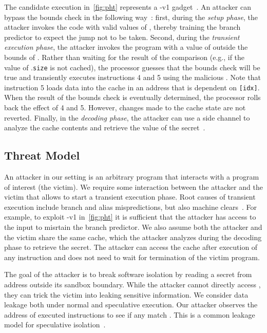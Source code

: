 \documentclass[conference]{IEEEtran}
\begin{document}
The candidate execution in~\autoref{fig:pht} represents a \spectre-v1 gadget~\cite{KocherHFGGHHLM019}.
An attacker can bypass the bounds check in the following way~\cite{CanellaB0LBOPEG19}:
first, during the \emph{setup phase}, the attacker invokes the code with valid values of \varidx, thereby training the branch predictor to expect the jump not to be taken.
Second, during the \emph{transient execution phase}, the attacker invokes the program with a value of \varidx outside the bounds of \varA.
Rather than waiting for the result of the comparison (e.g., if the value of \varA.\texttt{size} is not cached), the processor guesses that the bounds check will be true and transiently executes instructions 4 and 5 using the malicious \varidx.
Note that instruction 5 loads data into the cache in an address that is dependent on \texttt{{\varA}[{\color{violet}idx}]}.
When the result of the bounds check is eventually determined, the processor rolls back the effect of 4 and 5. %
However, changes made to the cache state are not reverted.
Finally, in the \emph{decoding phase}, the attacker can use a side channel to analyze the cache contents and retrieve the value of the secret~\cite{LiuYGHL15}.

\subsection{Threat Model}
\label{sec:threatmodel}

An attacker in our setting is an arbitrary program that interacts with a program of interest (the victim).
We require some interaction between the attacker and the victim that allows to start a transient execution phase.
Root causes of transient execution include branch and alias mispredictions, but also machine clears~\cite{ragab_rage_2021}.
For example, to exploit \spectre-v1 in~\autoref{fig:pht} it is sufficient that the attacker has access to the input \varidx to {mis{rt}ain} the branch predictor.
We also assume both the attacker and the victim share the same cache, which the attacker analyzes during the decoding phase to retrieve the secret.
The attacker can access the cache after execution of any instruction and does not need to wait for termination of the victim program.

The goal of the attacker is to break software isolation by reading a secret from address \secret{} outside its sandbox boundary.
While the attacker cannot directly access \secret{}, they can trick the victim into leaking sensitive information.
We consider data leakage both under normal and speculative execution.
Our attacker observes the address of executed \load instructions to see if any match \secret{}.
This is a common leakage model for speculative isolation~\cite{sok:spectre}.
\end{document}
